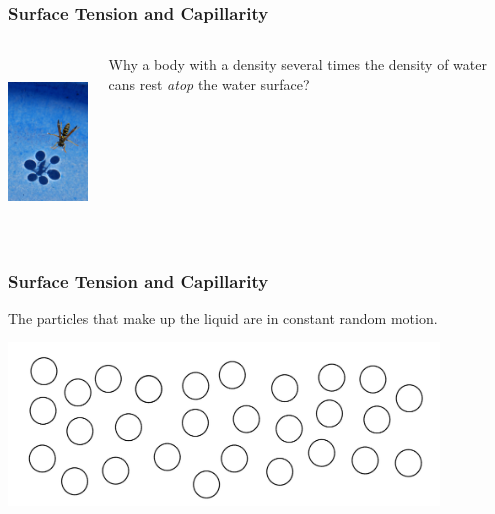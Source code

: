 \documentclass[]{beamer}
\begin{document}
\begin{frame}

  \frametitle{Surface Tension and Capillarity}
  
  \pause


  
  \begin{columns}[c]
    \column{2in}  %
 
    \begin{center}
      \includegraphics[height=1.8in]{images2/avispa.jpg}
    \end{center}
    
    \column{2in}
 
   
Why a body with a density several times the density of water cans rest \textit{atop} the water surface?
  
    \end{columns}
  
  
   \end{frame}



\begin{frame}

\frametitle{Surface Tension and Capillarity}



The particles that make up the liquid are in constant random motion.

  \begin{center}
  \includegraphics[height=1.7in]{images2/surfacet1.jpg}
\end{center}





 \end{frame}
\end{document}
